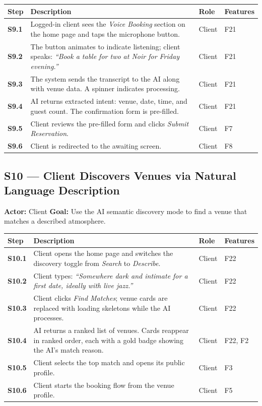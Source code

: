 \documentclass[12pt,a4paper]{article}
\begin{document}
\begin{longtable}{>{\bfseries}l L{6.5cm} l L{3cm}}
    \toprule
    Step & Description & Role & Features \\
    \midrule
    S9.1 & Logged-in client sees the \emph{Voice Booking} section on
           the home page and taps the microphone button. & Client & F21 \\
    S9.2 & The button animates to indicate listening; client speaks:
           \emph{``Book a table for two at Noir for Friday evening.''} & Client & F21 \\
    S9.3 & The system sends the transcript to the AI along with venue
           data. A spinner indicates processing. & Client & F21 \\
    S9.4 & AI returns extracted intent: venue, date, time, and guest
           count. The confirmation form is pre-filled. & Client & F21 \\
    S9.5 & Client reviews the pre-filled form and clicks \emph{Submit
           Reservation}. & Client & F7 \\
    S9.6 & Client is redirected to the awaiting screen. & Client & F8 \\
    \bottomrule
\end{longtable}

\subsection*{S10 --- Client Discovers Venues via Natural Language Description}
\begin{mdframed}[style=scenariobox]
\textbf{Actor:} Client \quad
\textbf{Goal:} Use the AI semantic discovery mode to find a venue that
matches a described atmosphere.
\end{mdframed}

\begin{longtable}{>{\bfseries}l L{6.5cm} l L{3cm}}
    \toprule
    Step & Description & Role & Features \\
    \midrule
    S10.1 & Client opens the home page and switches the discovery toggle
            from \emph{Search} to \emph{Describe}. & Client & F22 \\
    S10.2 & Client types: \emph{``Somewhere dark and intimate for a first
            date, ideally with live jazz.''} & Client & F22 \\
    S10.3 & Client clicks \emph{Find Matches}; venue cards are replaced
            with loading skeletons while the AI processes. & Client & F22 \\
    S10.4 & AI returns a ranked list of venues. Cards reappear in ranked
            order, each with a gold badge showing the AI's match reason. & Client & F22, F2 \\
    S10.5 & Client selects the top match and opens its public profile. & Client & F3 \\
    S10.6 & Client starts the booking flow from the venue profile. & Client & F5 \\
    \bottomrule
\end{longtable}
\end{document}
